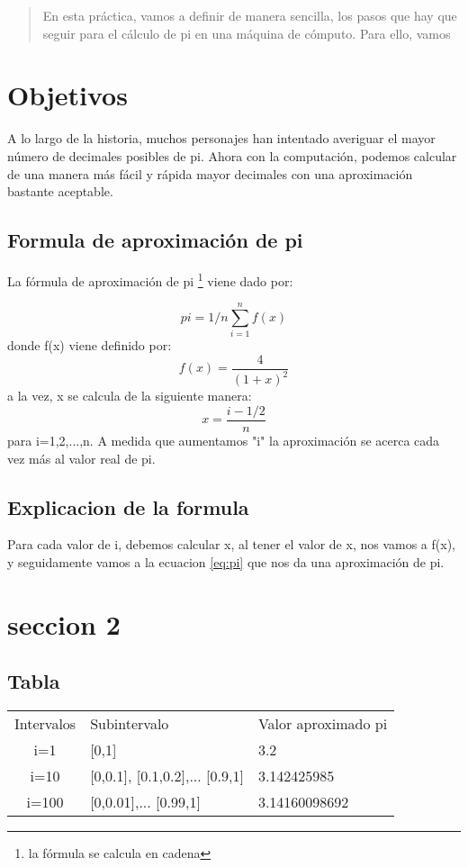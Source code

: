 \documentclass[spanish,a4paper,12pt]{article}
\begin{document}
\author{Cinthia Hernandez Trujillo}
\date{11 de abril de 2014}
\maketitle

\begin{abstract}
En esta práctica, vamos a definir de manera sencilla, los pasos que hay que seguir para el cálculo de pi en una máquina de cómputo. Para ello, vamos 
\end{abstract}

\section{Objetivos}
A lo largo de la historia, muchos personajes han intentado averiguar el mayor número de decimales posibles de pi. Ahora con la computación, podemos calcular
de una manera más fácil y rápida mayor decimales con una aproximación bastante aceptable.

\subsection{Formula de aproximación de pi}
La fórmula de aproximación de pi \footnote{la fórmula se calcula en cadena} viene dado por: 

\begin{equation}
   pi=1/n \sum_{i=1}^n f(x) 
   \label{eq:pi}
\end{equation}
donde f(x) viene definido por: 
\[
f(x)=\frac{4}{(1+x)^2}
\]
a la vez, x se calcula de la siguiente manera:
\[
x=\frac{i- 1/2}{n}
\]
para i=1,2,...,n. A medida que aumentamos "i" la aproximación se acerca cada vez más al valor real de pi.

\subsection{Explicacion de la formula}
Para cada valor de i, debemos calcular x, al tener el valor de x, nos vamos a f(x), y seguidamente vamos a la ecuacion \ref{eq:pi} que nos da una aproximación de pi.  

\section{seccion 2}

\subsection{Tabla}
\begin{tabular}{c}
    Intervalos & Subintervalo & Valor aproximado pi \\
    i=1 & [0,1] & 3.2 \\
    i=10 & [0,0.1], [0.1,0.2],... [0.9,1] &  3.142425985 \\
    i=100 & [0,0.01],... [0.99,1] & 3.14160098692 \\
\end{tabular}
\end{document}
